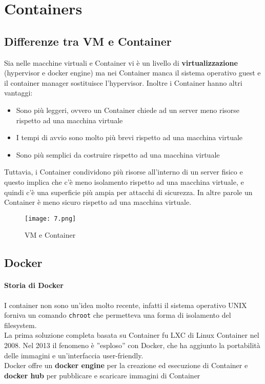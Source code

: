 \newpage
\section{Containers} \label{container}
\subsection{Differenze tra VM e Container}
Sia nelle macchine virtuali e Container vi è un livello di \textbf{virtualizzazione} (hypervisor e docker engine) ma nei Container manca il sistema operativo guest e il container manager sostituisce l'hypervisor. Inoltre i Container hanno altri vantaggi:
\begin{itemize}
    \item Sono più leggeri, ovvero un Container chiede ad un server meno risorse rispetto ad una macchina virtuale
    \item I tempi di avvio sono molto più brevi rispetto ad una macchina virtuale
    \item Sono più semplici da costruire rispetto ad una macchina virtuale
\end{itemize}
Tuttavia, i Container condividono più risorse all’interno di un server fisico e questo implica che c’è meno isolamento rispetto ad una macchina virtuale, e quindi c’è una superficie più ampia per attacchi di sicurezza. In altre parole un Container è meno sicuro rispetto ad una macchina virtuale.
\begin{figure}[h!]
    \centering
    \texttt{[image: 7.png]}
    \caption{VM e Container}
    \label{fig:enter-label}
\end{figure}

\subsection{Docker}
\paragraph{Storia di Docker} I container non sono un'idea molto recente, infatti il sistema operativo UNIX forniva un comando \verb|chroot| che permetteva una forma di isolamento del filesystem.\\
La prima soluzione completa basata su Container fu LXC di Linux Container nel 2008. Nel 2013 il fenomeno è ”esploso” con Docker, che ha aggiunto la portabilità delle immagini e un'interfaccia user-friendly.\\
Docker offre un \textbf{docker engine} per la creazione ed esecuzione di Container e \textbf{docker hub} per pubblicare e scaricare immagini di Container

